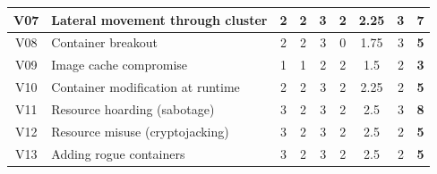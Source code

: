 \begin{landscape}
\begin{table}[]
{\begin{tabular}{|c|l|cccc|cc|c|}
V07             & Lateral movement through cluster                                                       & 2                                        & 2                              & 3                                        & 2                    & 2.25                                   & 3            & \textbf{7}           \\ \hline
V08             & Container breakout                                                                     & 2                                        & 2                              & 3                                        & 0                    & 1.75                                   & 3            & \textbf{5}           \\ \hline
V09             & Image cache compromise                                                                 & 1                                        & 1                              & 2                                        & 2                    & 1.5                                    & 2            & \textbf{3}           \\ \hline
V10             & Container modification at runtime                                                      & 2                                        & 2                              & 3                                        & 2                    & 2.25                                   & 2            & \textbf{5}           \\ \hline
V11             & Resource hoarding (sabotage)                                                           & 3                                        & 2                              & 3                                        & 2                    & 2.5                                    & 3            & \textbf{8}           \\ \hline
V12             & Resource misuse (cryptojacking)                                                        & 3                                        & 2                              & 3                                        & 2                    & 2.5                                    & 2            & \textbf{5}           \\ \hline
V13             & Adding rogue containers                                                                & 3                                        & 2                              & 3                                        & 2                    & 2.5                                    & 2            & \textbf{5}           \\ \hline

\end{tabular}}
\end{table}
\end{landscape}
